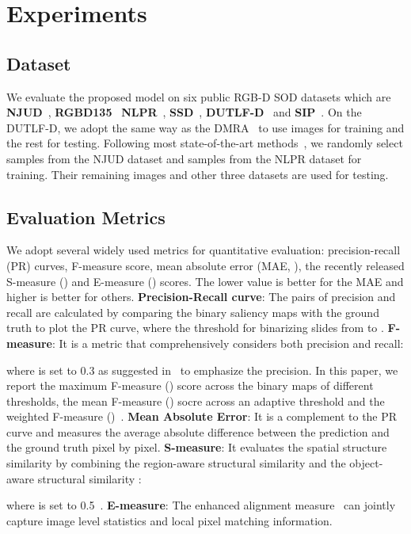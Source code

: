 \documentclass[runningheads]{llncs}
\begin{document}
\section{Experiments}
\subsection{Dataset}
 We evaluate the proposed model on six public RGB-D SOD datasets which are \textbf{NJUD}~\cite{NJU2000}, \textbf{RGBD135}~\cite{RGBD135} \textbf{NLPR}~\cite{early_fusion_1}, \textbf{SSD}~\cite{SSD}, \textbf{DUTLF-D}~\cite{DMRA} and \textbf{SIP}~\cite{SIP}.
On the DUTLF-D, we adopt the same way as the DMRA~\cite{DMRA} to use  images for training and the rest  for testing. Following most state-of-the-art methods~\cite{PCA,MMCI,CTMF,CPFP}, we randomly select  samples from the NJUD dataset and  samples from the NLPR dataset for training. Their remaining images and other three datasets are used for testing. 
\subsection{Evaluation Metrics} We adopt several widely used metrics for quantitative evaluation: precision-recall (PR) curves, F-measure score, mean absolute error (MAE, ), the recently released S-measure () and E-measure () scores. The lower value is better for the MAE and higher is better for others.
\textbf{Precision-Recall curve}: The pairs of precision and recall are calculated by comparing the binary saliency maps with the ground truth to plot the PR curve, where the threshold for binarizing slides from  to .
\textbf{F-measure}: It is a metric that comprehensively considers both precision and recall:
 
  where  is set to 0.3 as suggested in~\cite{colorcontrast_Fm} to emphasize the precision. In this paper, we report the maximum F-measure () score across the binary maps of different thresholds, the mean F-measure () socre across an adaptive threshold and the weighted F-measure ()~\cite{Fwb}.
\textbf{Mean Absolute Error}: It is a complement to the PR curve and measures the average absolute difference between the prediction and the  ground truth pixel by pixel.
\textbf{S-measure}: It evaluates the spatial structure similarity by combining the region-aware structural similarity   and the object-aware structural similarity  : 

where  is set to 0.5~\cite{S-m}.
\textbf{E-measure}: The enhanced alignment measure~\cite{Em} can jointly capture image level statistics and local pixel matching information.
\\
\end{document}
